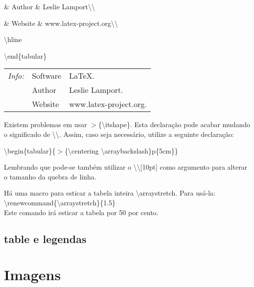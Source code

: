 	      \& Author \& Leslie Lamport\textbackslash \textbackslash 

	      \& Website \& www.latex-project.org\textbackslash \textbackslash 

	\textbackslash hline

\textbackslash end\{tabular\}

\sffamily

\setlength{\extrarowheight}{4pt}
\begin{tabular}{@{}>{\itshape}ll!{:}l<{.}@{}}
	\hline
	Info: & Software & \LaTeX \\
	      & Author & Leslie Lamport\\
	      & Website & www.latex-project.org\\
	\hline
\end{tabular}

\setlength{\extrarowheight}{0pt} %

Existem problemas em usar $>$\{\textbackslash itshape\}. Esta declaração pode
acabar mudando o significado de \textbackslash \textbackslash. Assim, caso seja
necessário, utilize a seguinte declaração:

\textbackslash begin\{tabular\}\{$>$\{\textbackslash centering \textbackslash arraybackslash\}p\{5cm\}\}

Lembrando que pode-se também utilizar o \textbackslash \textbackslash [10pt] como argumento para alterar o tamanho da quebra de linha.

Há uma macro para esticar a tabela inteira \textbackslash arraystretch. Para
usá-la:\\
\textbackslash renewcommand\{\textbackslash arraystretch\}\{1.5\}\\
\indent Este comando irá esticar a tabela por 50 por cento.







\subsection{table e legendas}


\section{Imagens}

\newpage
